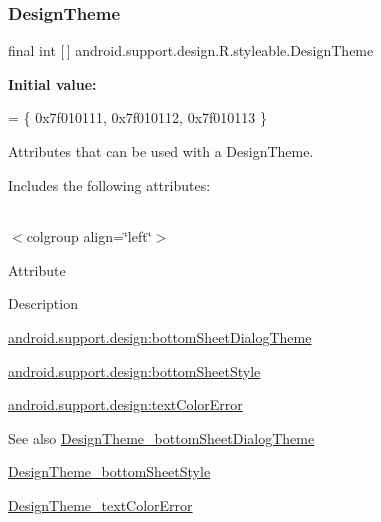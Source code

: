 \subsubsection{\texorpdfstring{Design\+Theme}{DesignTheme}}
{\footnotesize\ttfamily final int \mbox{[}$\,$\mbox{]} android.\+support.\+design.\+R.\+styleable.\+Design\+Theme\hspace{0.3cm}{\ttfamily [static]}}

{\bfseries Initial value\+:}
\begin{DoxyCode}
= \{
            0x7f010111, 0x7f010112, 0x7f010113
        \}
\end{DoxyCode}
Attributes that can be used with a Design\+Theme. 

Includes the following attributes\+:

\tabulinesep=1mm
\begin{longtabu} spread 0pt [c]{*{0}{|X[-1]}|}
\hline
\end{longtabu}
$<$colgroup align=\char`\"{}left\char`\"{}$>$ 

Attribute

Description 

{\ttfamily \hyperlink{classandroid_1_1support_1_1design_1_1R_1_1styleable_ac81e65cd7cad5fae4da63f17ad8b3e8b}{android.\+support.\+design\+:bottom\+Sheet\+Dialog\+Theme}}

{\ttfamily \hyperlink{classandroid_1_1support_1_1design_1_1R_1_1styleable_a1c6c9dd91389f33d763839d8c0b2dfbe}{android.\+support.\+design\+:bottom\+Sheet\+Style}}

{\ttfamily \hyperlink{classandroid_1_1support_1_1design_1_1R_1_1styleable_a79782f371783faa40fa7a6a6385de284}{android.\+support.\+design\+:text\+Color\+Error}}

\begin{DoxySeeAlso}{See also}
\hyperlink{classandroid_1_1support_1_1design_1_1R_1_1styleable_ac81e65cd7cad5fae4da63f17ad8b3e8b}{Design\+Theme\+\_\+bottom\+Sheet\+Dialog\+Theme} 

\hyperlink{classandroid_1_1support_1_1design_1_1R_1_1styleable_a1c6c9dd91389f33d763839d8c0b2dfbe}{Design\+Theme\+\_\+bottom\+Sheet\+Style} 

\hyperlink{classandroid_1_1support_1_1design_1_1R_1_1styleable_a79782f371783faa40fa7a6a6385de284}{Design\+Theme\+\_\+text\+Color\+Error} 
\end{DoxySeeAlso}
\mbox{\label{classandroid_1_1support_1_1design_1_1R_1_1styleable_ac81e65cd7cad5fae4da63f17ad8b3e8b}} 
